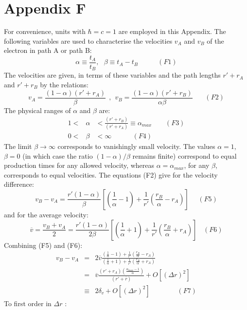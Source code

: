 \documentclass [12pt]{article}
\begin{document}
{  \newpage
  \section*{\bf Appendix F}
  \par   For convenience, units with $\hbar = c =1$ are employed in this Appendix.
   The following variables are used to characterise the velocities $v_A$ and $v_B$ of the electron in
   path A or path B:
  \[ \alpha \equiv \frac{ t_A}{ t_B},~~~\beta \equiv  t_A- t_B ~~~~~~~~~~~~~(F1) \]
    The velocities are given, in terms of these variables and the path lengths $r'+r_A$ and $r'+r_B$ by
 the relations:
   \[ v_A =\frac{(1-\alpha)(r'+r_A)}{\beta}~~,~~ v_B =\frac{(1-\alpha)(r'+r_B)}{ \alpha \beta}~~~~~~~~(F2) \]
   The physical ranges of $\alpha$ and $\beta$ are:
    \begin{eqnarray}
     1 <  & \alpha & < \frac{(r'+r_B)}{(r'+r_A)} \equiv \alpha_{max} \nonumber~~~~~~~~~(F3) \\
     0 < & \beta & < \infty  \nonumber~~~~~~~~~~~~~~(F4)
   \end{eqnarray}
   The limit $\beta \rightarrow \infty$ corresponds to vanishingly small velocity.  The values $\alpha = 1$, $\beta = 0$
   (in which case the ratio $(1-\alpha)/\beta$ remains finite) correspond to equal production times for any allowed velocity,
    whereas $\alpha = \alpha_{max}$, for any $\beta$, corresponds to equal velocities. The equations (F2) give
    for the velocity difference:
    \[ v_B -v_A = \frac{r'(1-\alpha)}{\beta}\left[(\frac{1}{\alpha}-1)+ \frac{1}{r'}(\frac{r_B}{\alpha}-r_A)\right]~~~~~~(F5) \]
      and for the average velocity:
     \[ \overline{v} = \frac{v_B +v_A}{2} = 
     \frac{r'(1-\alpha)}{2 \beta}\left[(\frac{1}{\alpha}+1)+ \frac{1}{r'}(\frac{r_B}{\alpha}+r_A)\right]~~~~(F6) \]
     Combining (F5) and (F6):
    \begin{eqnarray}   
     v_B -v_A & = &   2  \overline{v}\frac{(\frac{1}{\alpha}-1)+ \frac{1}{r'}(\frac{r_B}{\alpha}-r_A)}
      {(\frac{1}{\alpha}+1)+ \frac{1}{r'}(\frac{r_B}{\alpha}+r_A)}  \nonumber \\
      & = & \overline{v} \frac{(r'+r_A)(\frac{\alpha_{max}-1}{\alpha})}{(r'+\overline{r})} + O[(\Delta r)^2]
       \nonumber \\
      & \equiv & 2 \delta_v + O[(\Delta r)^2]~~~~~~~~~~~~~~~~~~(F7) \nonumber
    \end{eqnarray}
    To first order in $\Delta r$ :

}
\end{document}
